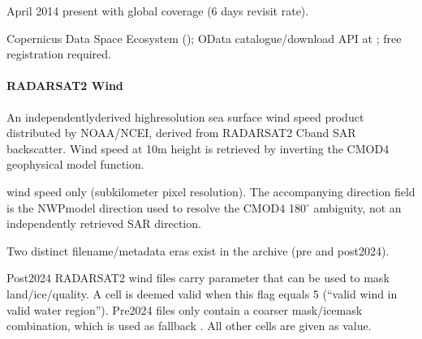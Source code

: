 \documentclass[a4paper,10pt,english]{sphinxmanual}
\begin{document}
\sphinxAtStartPar
{}

 April 2014 \sphinxhyphen{} present with global coverage (6 days revisit rate).

\sphinxAtStartPar
{}

\sphinxAtStartPar
Copernicus Data Space Ecosystem (); OData catalogue/download API at ; free registration required.


\paragraph{RADARSAT\sphinxhyphen{}2 Wind}
\label{\detokenize{05_reference_datasets:radarsat-2-wind}}
\sphinxAtStartPar
{}

\sphinxAtStartPar
An independently\sphinxhyphen{}derived high\sphinxhyphen{}resolution sea surface wind speed product distributed by NOAA/NCEI, derived from RADARSAT\sphinxhyphen{}2 C\sphinxhyphen{}band SAR backscatter. Wind speed at 10m height is retrieved by inverting the CMOD4 geophysical model function.

\sphinxAtStartPar
{}

\sphinxAtStartPar
wind speed only (sub\sphinxhyphen{}kilometer pixel resolution). The accompanying direction field is the NWP\sphinxhyphen{}model direction used to resolve the CMOD4 180\(^\circ\) ambiguity, not an independently retrieved SAR direction.

\sphinxAtStartPar
Two distinct filename/metadata eras exist in the archive (pre\sphinxhyphen{} and post\sphinxhyphen{}2024).

\sphinxAtStartPar
{}

\sphinxAtStartPar
Post\sphinxhyphen{}2024 RADARSAT\sphinxhyphen{}2 wind files carry  parameter that can be used to mask land/ice/quality. A cell is deemed valid when this flag equals 5 (“valid wind in valid water region”). Pre\sphinxhyphen{}2024 files only contain a coarser mask/ice\sphinxhyphen{}mask combination, which is used as fallback . All other cells are given  as value.

\sphinxAtStartPar
{}
\end{document}

